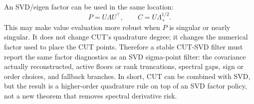 An SVD/eigen factor can be used in the same location:
\[
  P=U\Lambda U^\top,\qquad C=U\Lambda_+^{1/2}.
\]
This may make value evaluation more robust when $P$ is singular or nearly
singular.  It does not change CUT's quadrature degree; it changes the numerical
factor used to place the CUT points.  Therefore a stable CUT-SVD filter must
report the same factor diagnostics as an SVD sigma-point filter: the covariance
actually reconstructed, active floors or rank truncations, spectral gaps, sign
or order choices, and fallback branches.  In short, CUT can be combined with
SVD, but the result is a higher-order quadrature rule on top of an SVD factor
policy, not a new theorem that removes spectral derivative risk.
